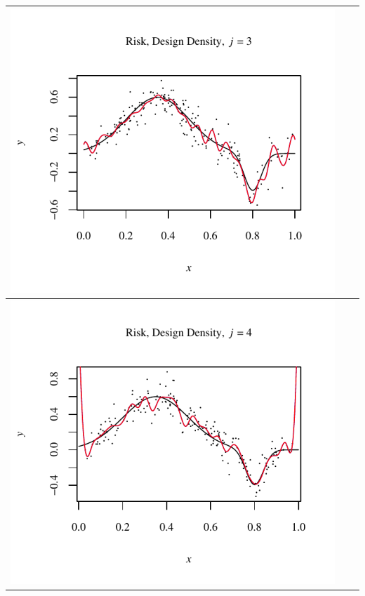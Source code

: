 \documentclass[11pt]{article}
\begin{document}
\begin{table}[h!]
\begin{center}
\begin{tabular}{| >{\centering\arraybackslash}m{2.1in} |  >{\centering\arraybackslash}m{2.1in} |  >{\centering\arraybackslash}m{2.1in}|}
      \includegraphics[width=1\linewidth,height=0.18\textheight]{Graphs/4/2/assignment5_a_4_2_3}\\\hline
      \includegraphics[width=1\linewidth,height=0.18\textheight]{Graphs/4/2/assignment5_a_4_2_4}&

\end{tabular}
\end{center}
\end{table}
\end{document}
